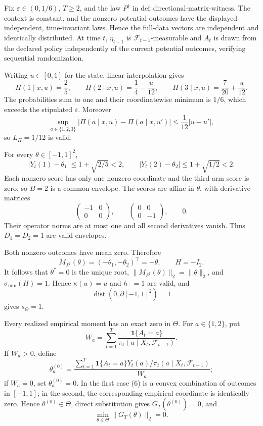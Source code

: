 Fix \(\varepsilon\in(0,1/6)\), \(T\ge2\), and the law \(P^\dagger\) in
\(\mathrm{def:directional\text{-}matrix\text{-}witness}\).  The context is
constant, and the nonzero potential outcomes have the displayed independent,
time-invariant laws.  Hence the full-data vectors are independent and
identically distributed.  At time \(t\), \(\eta_{t-1}\) is
\(\mathcal F_{t-1}\)-measurable and \(A_t\) is drawn from the declared
policy independently of the current potential outcomes, verifying
sequential randomization.

Writing \(u\in[0,1]\) for the state, linear interpolation gives
\[
 \Pi(1\mid x,u)=\frac25,\qquad
 \Pi(2\mid x,u)=\frac14-\frac{u}{12},\qquad
 \Pi(3\mid x,u)=\frac7{20}+\frac{u}{12}.
\tag{1}
\]
The probabilities sum to one and their coordinatewise minimum is \(1/6\),
which exceeds the stipulated \(\varepsilon\).  Moreover
\[
 \sup_{a\in\{1,2,3\}}|\Pi(a\mid x,u)-\Pi(a\mid x,u')|
 \le\frac1{12}|u-u'|,
\tag{2}
\]
so \(L_\Pi=1/12\) is valid.

For every \(\theta\in[-1,1]^2\),
\[
 |Y_t(1)-\theta_1|\le1+\sqrt{2/5}<2,
 \qquad |Y_t(2)-\theta_2|\le1+\sqrt{1/2}<2.
\tag{3}
\]
Each nonzero score has only one nonzero coordinate and the third-arm score is
zero, so \(B=2\) is a common envelope.  The scores are affine in \(\theta\),
with derivative matrices
\[
 \begin{pmatrix}-1&0\\0&0\end{pmatrix},\qquad
 \begin{pmatrix}0&0\\0&-1\end{pmatrix},\qquad 0.
\]
Their operator norms are at most one and all second derivatives vanish.
Thus \(D_1=D_2=1\) are valid envelopes.

Both nonzero outcomes have mean zero.  Therefore
\[
 M_{P^\dagger}(\theta)=(-\theta_1,-\theta_2)^\top=-\theta,
 \qquad H=-I_2.
\tag{4}
\]
It follows that \(\theta^*=0\) is the unique root,
\(\|M_{P^\dagger}(\theta)\|_2=\|\theta\|_2\), and
\(\sigma_{\min}(H)=1\).  Hence \(\kappa(u)=u\) and \(h_-=1\) are valid,
and
\[
 \operatorname{dist}(0,\partial[-1,1]^2)=1
\tag{5}
\]
gives \(s_\Theta=1\).

Every realized empirical moment has an exact zero in \(\Theta\).  For
\(a\in\{1,2\}\), put
\[
 W_a=\sum_{t=1}^T\frac{\mathbf1\{A_t=a\}}
 {\pi_t(a\mid X_t,\mathcal F_{t-1})}.
\]
If \(W_a>0\), define
\[
 \theta_a^{(0)}=
 \frac{\sum_{t=1}^T\mathbf1\{A_t=a\}Y_t(a)/
 \pi_t(a\mid X_t,\mathcal F_{t-1})}{W_a};
\tag{6}
\]
if \(W_a=0\), set \(\theta_a^{(0)}=0\).  In the first case (6) is a
convex combination of outcomes in \([-1,1]\); in the second, the
corresponding empirical coordinate is identically zero.  Hence
\(\theta^{(0)}\in\Theta\), direct substitution gives
\(G_T(\theta^{(0)})=0\), and
\[
 \min_{\theta\in\Theta}\|G_T(\theta)\|_2=0.
\tag{7}
\]

